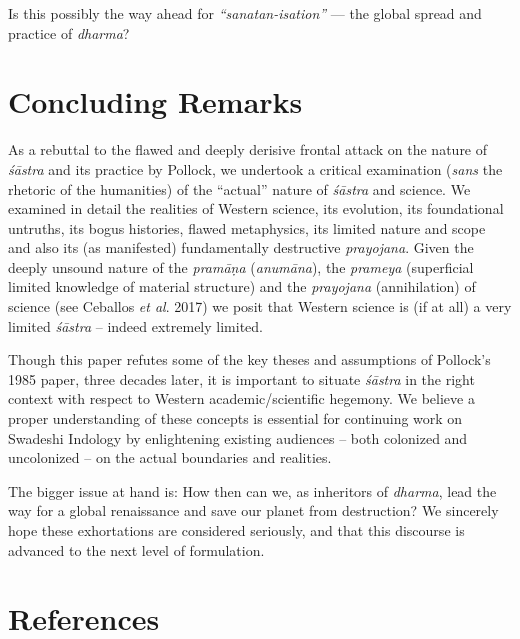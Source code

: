 Is this possibly the way ahead for \textit{“sanatan-isation”} — the global spread and practice of \textit{dharma}?


\section*{Concluding Remarks}

As a rebuttal to the flawed and deeply derisive frontal attack on the nature of \textit{śāstra} and its practice by Pollock, we undertook a critical examination (\textit{sans} the rhetoric of the humanities) of the “actual” nature of \textit{śāstra} and science. We examined in detail the realities of Western science, its evolution, its foundational untruths, its bogus histories, flawed metaphysics, its limited nature and scope and also its (as manifested) fundamentally destructive \textit{prayojana}. Given the deeply unsound nature of the \textit{pramāṇa} (\textit{anumāna}), the \textit{prameya} (superficial limited knowledge of material structure) and the \textit{prayojana} (annihilation) of science (see Ceballos \textit{et al}. 2017) we posit that Western science is (if at all) a very limited \textit{śāstra} – indeed extremely limited.

Though this paper refutes some of the key theses and assumptions of Pollock’s 1985 paper, three decades later, it is important to situate \textit{śāstra} in the right context with respect to Western academic/scientific hegemony. We believe a proper understanding of these concepts is essential for continuing work on Swadeshi Indology by enlightening existing audiences – both colonized and uncolonized – on the actual boundaries and realities.

The bigger issue at hand is: How then can we, as inheritors of \textit{dharma}, lead the way for a global renaissance and save our planet from destruction? We sincerely hope these exhortations are considered seriously, and that this discourse is advanced to the next level of formulation.


\section*{References}

